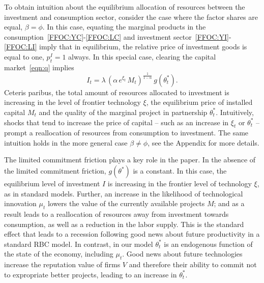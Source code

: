 \documentclass[12pt]{article}
\begin{document}
To obtain intuition about the equilibrium allocation of resources between the investment and consumption sector, consider the case where the factor shares are equal, $\beta=\phi$. In this case, equating the marginal products in the   consumption~\eqref{FFOC:YC}-\eqref{FFOC:LC}  and investment sector~\eqref{FFOC:YI}-\eqref{FFOC:LI} imply that in equilibrium, the relative price of investment goods is equal to one, $p^I_t =1$ always. In this special case, clearing the capital market~\eqref{eqn:q} implies
\begin{equation}\label{eqn:qS}
I_t = \lambda \, \left(  \alpha \, e^{\xi_t}  \, M_t \right)^{\frac{1}{1-\alpha}} \,    { g(\theta_t^*)} .
\end{equation}
Ceteris paribus, the total amount of resources allocated to investment is increasing in the level of frontier technology $\xi$, the equilibrium price of installed capital $M_t$ and the quality of the marginal project in partnership $\theta^*_t$. Intuitively, shocks that tend to increase the price of capital -- such as an increase in $\xi_t$ or $\theta_t^*$ -- prompt a reallocation of resources from consumption to investment. The same intuition holds in the more general case $\beta\neq \phi$, see the Appendix for more details.


The limited commitment friction plays a key role in the paper. In the absence of the limited commitment friction, $g(\theta^*)$ is a constant. In this case, the equilibrium level of investment $I$ is increasing in the frontier level of technology $\xi$, as in standard models. Further, an increase in the likelihood of technological innovation $\mu_t$ lowers the value of the currently available projects $M $; and as a result leads to a reallocation of resources away from investment towards consumption, as well as a reduction in the labor supply. This is the standard effect that leads to a recession following good news about future productivity in a standard RBC model.  In contrast, in our model $\theta_t^*$ is an endogenous function of the state of the economy, including $\mu_t$. Good news about future technologies increase the reputation value of firms $V$ and therefore their ability to commit not to expropriate better projects, leading to an increase in $\theta_t^*$.




\end{document}
